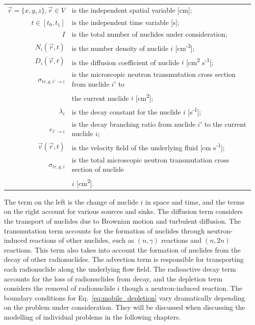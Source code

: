 \begin{tabular}{rl}
     $\vec{r} = \{x,y,z\},\vec{r}\in V$ &  is the independent spatial variable [cm];\\
     $t\in [t_{0}, t_{1}]$ & is the independent time variable [s];\\
     $I$ & is the total number of nuclides under consideration;\\
     $N_{i}(\vec{r}, t)$ & is the number density of nuclide $i$ [cm\textsuperscript{-3}];\\
     $D_{i}(\vec{r}, t)$ & is the diffusion coefficient of nuclide $i$ [cm\textsuperscript{2} s\textsuperscript{-1}];\\
     $\sigma_{tr,g,i'\rightarrow i}$ & is the microscopic neutron transmutation cross section from nuclide $i'$ to\\& the current nuclide $i$ [cm\textsuperscript{2}];\\
     $\lambda_{i}$ & is the decay constant for the nuclide $i$ [s\textsuperscript{-1}];\\
     $r_{i'\rightarrow i}$ & is the decay branching ratio from nuclide $i'$ to the current nuclide $i$;\\
     $\vec{v}(\vec{r}, t)$ & is the velocity field of the underlying fluid [cm s\textsuperscript{-1}];\\
     $\sigma_{tr,g,i}$ & is the total microscopic neutron transmutation cross section of nuclide\\ 
     &$i$ [cm\textsuperscript{2}].
\end{tabular}

\noindent The term on the left is the change of nuclide $i$ in space and time, and the terms on the right account for various sources and sinks. The diffusion term considers the transport of nuclides due to Brownian motion and turbulent diffusion. The transmutation term accounts for the formation of nuclides through neutron-induced reactions of other nuclides, such as $(n,\gamma)$ reactions and $(n,2n)$ reactions. This term also takes into account the formation of nuclides from the decay of other radionuclides. The advection term is responsible for transporting each radionuclide along the underlying flow field. The radioactive decay term accounts for the loss of radionuclides from decay, and the depletion term considers the removal of radionuclide $i$ though a neutron-induced reaction. The boundary conditions for Eq.~\ref{eq:mobile_depletion} vary dramatically depending on the problem under consideration. They will be discussed when discussing the modelling of individual problems in the following chapters.

